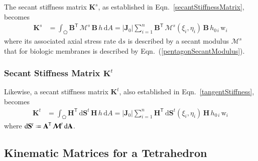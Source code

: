 The secant stiffness matrix $\mathbf{K}^s$, as established in Eqn.~\eqref{secantStiffnessMatrix}, becomes
\begin{equation}
	\begin{aligned}
		\mathbf{K}^s & =\int_{\pentagon} \mathbf{B}^{\mathsf{T}} \,  \boldsymbol{\mathcal{M}}^s \, \mathbf{B}  \, h \,  \mathrm{d} A
		= |\mathbf{J}_0| \sum_{i=1}^{n}  \mathbf{B}^{\mathsf{T}} \, \boldsymbol{\mathcal{M}}^s (\xi_i, \eta_i) \, \mathbf{B} \, h_{0\,i} \, \mathrm{w}_i 
	\end{aligned}
\end{equation} 
where its associated axial stress rate $\mathrm{d} s$ is described by a secant modulus $\boldsymbol{\mathcal{M}}^{s}$ that for biologic membranes is described by Eqn.~(\ref{pentagonSecantModulus}).


\subsubsection{Secant Stiffness Matrix $\mathbf{K}^t$}

Likewise, a secant stiffness matrix $\mathbf{K}^t$, also established in Eqn.~\eqref{tangentStiffness}, becomes 
\begin{equation}
	\begin{aligned}
		\mathbf{K}^t & = \int_{\pentagon} \mathbf{H}^{\mathsf{T}} \,  \mathrm{d} \mathbf{S}^t \, \mathbf{H}  \, h \,  \mathrm{d} A
		= | \mathbf{J}_0 | \sum_{i=1}^{n}  \mathbf{H}^{\mathsf{T}} \,  \mathrm{d} \mathbf{S}^t (\xi_i, \eta_i) \, \mathbf{H} \, h_{0\,i} \, \mathrm{w}_i
	\end{aligned}
\end{equation}
where $\mathrm{d} \mathbf{S}^t \defeq \mathbf{A}^{\mathsf{T}} \, \boldsymbol{\mathcal{M}}^t \, \mathrm{d} \mathbf{A}$.

\subsection{Kinematic Matrices for a Tetrahedron}

